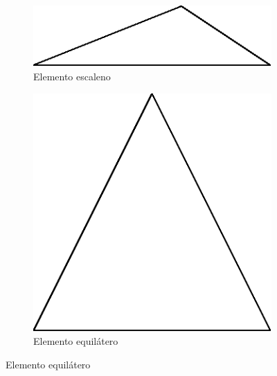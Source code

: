 \begin{figure}[ht]
    \begin{subfigure}{.5\textwidth}
        \centering
        \includegraphics[width=.8\linewidth]{fig/escaleno.eps}
        \caption{Elemento escaleno}
        \label{fig:sub-escaleno}
    \end{subfigure}
    \begin{subfigure}{.5\textwidth}
        \centering
        \includegraphics[width=.4\linewidth]{fig/equilatero.eps}
        \caption{Elemento equilátero}
        \label{fig:sub-second}
    \end{subfigure}


\end{figure}
